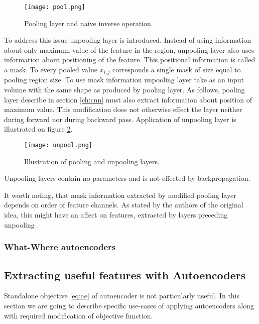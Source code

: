 \begin{figure}[h!]
  \centering
    \texttt{[image: pool.png]}
  \caption{Pooling layer and naive inverse operation.}
  \label{fig:pool}
\end{figure}

To address this issue unpooling layer is introduced. Instead of using information about only maximum value of the feature in the region, unpooling layer also uses information about positioning of the feature. This positional information is called a mask. To every pooled value $x_{i,j}$ corresponds a single mask of size equal to pooling region size. To use mask information  unpooling layer take as an input volume with the same shape as produced by pooling layer. As follows, pooling layer describe in section \ref{ch:cnn} must also extract information about position of maximum value. This modification does not otherwise effect the layer neither during forward nor during backward pass. Application of unpooling layer is illustrated on figure \ref{fig:unpool}.

\begin{figure}[h!]
  \centering
    \texttt{[image: unpool.png]}
  \caption{Illustration of pooling and unpooling layers.}
  \label{fig:unpool}
\end{figure}

Unpooling layers contain no parameters and is not effected by backpropagation.

It worth noting, that mask information extracted by modified pooling layer depends on order of feature channels. As stated by the authors of the original idea, this might have an affect on features, extracted by layers preceding unpooling \cite{Zhao2015}.

\subsubsection{What-Where autoencoders}



\subsection{Extracting useful features with Autoencoders}\label{ch:mod_ae}

Standalone objective \ref{eq:ae} of autoencoder is not particularly useful.
In this section we are going to describe specific use-cases of applying autoencoders along with required modification of objective function.

